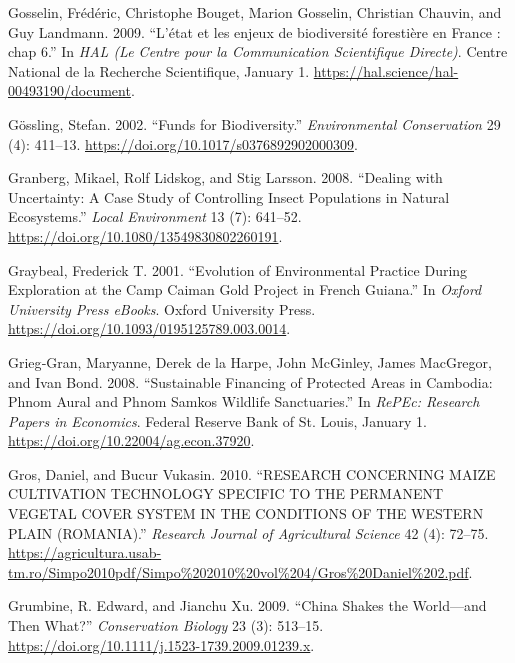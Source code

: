 \begin{CSLReferences}{1}{1}
Gosselin, Frédéric, Christophe Bouget, Marion Gosselin, Christian
Chauvin, and Guy Landmann. 2009. {``L'état et les enjeux de biodiversité
forestière en France : chap 6.''} In \emph{HAL (Le Centre pour la
Communication Scientifique Directe)}. Centre National de la Recherche
Scientifique, January 1.
\url{https://hal.science/hal-00493190/document}.

Gössling, Stefan. 2002. {``Funds for Biodiversity.''}
\emph{Environmental Conservation} 29 (4): 411--13.
\url{https://doi.org/10.1017/s0376892902000309}.

Granberg, Mikael, Rolf Lidskog, and Stig Larsson. 2008. {``Dealing with
Uncertainty: A Case Study of Controlling Insect Populations in Natural
Ecosystems.''} \emph{Local Environment} 13 (7): 641--52.
\url{https://doi.org/10.1080/13549830802260191}.

Graybeal, Frederick T. 2001. {``Evolution of Environmental Practice
During Exploration at the Camp Caiman Gold Project in French Guiana.''}
In \emph{Oxford University Press eBooks}. Oxford University Press.
\url{https://doi.org/10.1093/0195125789.003.0014}.

Grieg‐Gran, Maryanne, Derek de la Harpe, John McGinley, James MacGregor,
and Ivan Bond. 2008. {``Sustainable Financing of Protected Areas in
Cambodia: Phnom Aural and Phnom Samkos Wildlife Sanctuaries.''} In
\emph{RePEc: Research Papers in Economics}. Federal Reserve Bank of St.
Louis, January 1. \url{https://doi.org/10.22004/ag.econ.37920}.

Gros, Daniel, and Bucur Vukasin. 2010. {``RESEARCH CONCERNING MAIZE
CULTIVATION TECHNOLOGY SPECIFIC TO THE PERMANENT VEGETAL COVER SYSTEM IN
THE CONDITIONS OF THE WESTERN PLAIN (ROMANIA).''} \emph{Research Journal
of Agricultural Science} 42 (4): 72--75.
\url{https://agricultura.usab-tm.ro/Simpo2010pdf/Simpo\%202010\%20vol\%204/Gros\%20Daniel\%202.pdf}.

Grumbine, R. Edward, and Jianchu Xu. 2009. {``China Shakes the
World---and Then What?''} \emph{Conservation Biology} 23 (3): 513--15.
\url{https://doi.org/10.1111/j.1523-1739.2009.01239.x}.


\end{CSLReferences}
